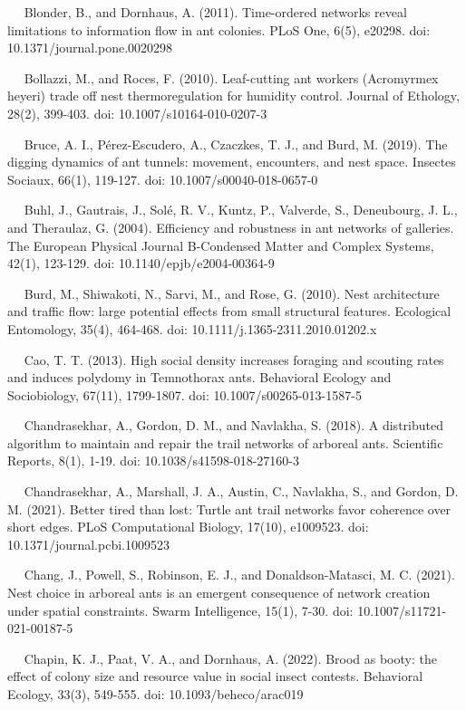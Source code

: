 \documentclass[3p]{elsarticle} %
\begin{document}
~~ Blonder, B., and Dornhaus, A. (2011). Time-ordered networks reveal
limitations to information flow in ant colonies. PLoS One, 6(5), e20298.
doi: 10.1371/journal.pone.0020298

~~ Bollazzi, M., and Roces, F. (2010). Leaf-cutting ant workers
(Acromyrmex heyeri) trade off nest thermoregulation for humidity
control. Journal of Ethology, 28(2), 399-403. doi:
10.1007/s10164-010-0207-3

~~ Bruce, A. I., Pérez-Escudero, A., Czaczkes, T. J., and Burd, M.
(2019). The digging dynamics of ant tunnels: movement, encounters, and
nest space. Insectes Sociaux, 66(1), 119-127. doi:
10.1007/s00040-018-0657-0

~~ Buhl, J., Gautrais, J., Solé, R. V., Kuntz, P., Valverde, S.,
Deneubourg, J. L., and Theraulaz, G. (2004). Efficiency and robustness
in ant networks of galleries. The European Physical Journal B-Condensed
Matter and Complex Systems, 42(1), 123-129. doi:
10.1140/epjb/e2004-00364-9

~~ Burd, M., Shiwakoti, N., Sarvi, M., and Rose, G. (2010). Nest
architecture and traffic flow: large potential effects from small
structural features. Ecological Entomology, 35(4), 464-468. doi:
10.1111/j.1365-2311.2010.01202.x

~~ Cao, T. T. (2013). High social density increases foraging and
scouting rates and induces polydomy in Temnothorax ants. Behavioral
Ecology and Sociobiology, 67(11), 1799-1807. doi:
10.1007/s00265-013-1587-5

~~ Chandrasekhar, A., Gordon, D. M., and Navlakha, S. (2018). A
distributed algorithm to maintain and repair the trail networks of
arboreal ants. Scientific Reports, 8(1), 1-19. doi:
10.1038/s41598-018-27160-3

~~ Chandrasekhar, A., Marshall, J. A., Austin, C., Navlakha, S., and
Gordon, D. M. (2021). Better tired than lost: Turtle ant trail networks
favor coherence over short edges. PLoS Computational Biology, 17(10),
e1009523. doi: 10.1371/journal.pcbi.1009523

~~ Chang, J., Powell, S., Robinson, E. J., and Donaldson-Matasci, M. C.
(2021). Nest choice in arboreal ants is an emergent consequence of
network creation under spatial constraints. Swarm Intelligence, 15(1),
7-30. doi: 10.1007/s11721-021-00187-5

~~ Chapin, K. J., Paat, V. A., and Dornhaus, A. (2022). Brood as booty:
the effect of colony size and resource value in social insect contests.
Behavioral Ecology, 33(3), 549-555. doi: 10.1093/beheco/arac019
\end{document}
